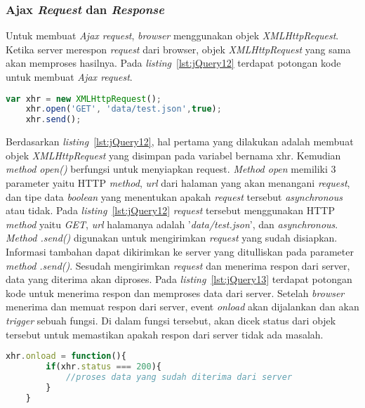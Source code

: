 \subsubsection{Ajax \textit{Request} dan \textit{Response}}
Untuk membuat \textit{Ajax request}, \textit{browser} menggunakan objek \textit{XMLHttpRequest}. Ketika server merespon \textit{request} dari browser, objek \textit{XMLHttpRequest} yang sama akan memproses hasilnya. Pada \textit{listing}~\ref{lst:jQuery12} terdapat potongan kode untuk membuat \textit{Ajax request}. 

\begin{lstlisting}[language=Javascript, caption=Membuat \textit{Ajax request} , label={lst:jQuery12}]
	var xhr = new XMLHttpRequest();
	xhr.open('GET', 'data/test.json',true);
	xhr.send();
\end{lstlisting}

Berdasarkan \textit{listing}~\ref{lst:jQuery12}, hal pertama yang dilakukan adalah membuat objek \textit{XMLHttpRequest} yang disimpan pada variabel bernama xhr. Kemudian \textit{method open()} berfungsi untuk menyiapkan request. \textit{Method open} memiliki 3 parameter yaitu HTTP \textit{method}, \textit{url} dari halaman yang akan menangani \textit{request}, dan tipe data \textit{boolean} yang menentukan apakah \textit{request} tersebut \textit{asynchronous} atau tidak. Pada \textit{listing}~\ref{lst:jQuery12} \textit{request} tersebut menggunakan HTTP \textit{method} yaitu \textit{GET}, \textit{url} halamanya adalah '\textit{data/test.json}', dan \textit{asynchronous}. \textit{Method .send()} digunakan untuk mengirimkan \textit{request} yang sudah disiapkan. Informasi tambahan dapat dikirimkan ke server yang ditulliskan pada parameter \textit{method .send()}. Sesudah mengirimkan \textit{request} dan menerima respon dari server, data yang diterima akan diproses. Pada \textit{listing}~\ref{lst:jQuery13} terdapat potongan kode untuk menerima respon dan memproses data dari server. Setelah \textit{browser} menerima dan memuat respon dari server, event \textit{onload} akan dijalankan dan akan \textit{trigger} sebuah fungsi. Di dalam fungsi tersebut, akan dicek status dari objek tersebut untuk memastikan apakah respon dari server tidak ada masalah. 

\begin{lstlisting}[language=Javascript, caption=Memproses respon yang didapat dari server, label={lst:jQuery13}]
	xhr.onload = function(){
		if(xhr.status === 200){
			//proses data yang sudah diterima dari server
		}
	}
\end{lstlisting}

